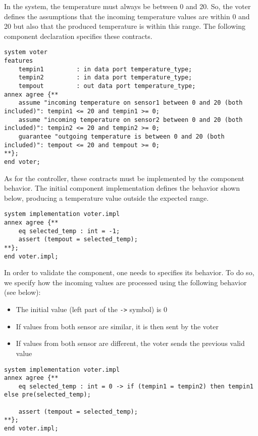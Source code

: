 \documentclass[times, 10pt]{article}
\begin{document}
    In the system, the temperature must always be between 0 and 20. So, the
    voter defines the assumptions that the incoming temperature values are
    within 0 and 20 but also that the produced temperature is within this range.
    The following component declaration specifies these contracts.

\begin{lstlisting}
system voter
features
	tempin1 		: in data port temperature_type;
	tempin2 		: in data port temperature_type;
	tempout 		: out data port temperature_type;
annex agree {**
    assume "incoming temperature on sensor1 between 0 and 20 (both included)": tempin1 <= 20 and tempin1 >= 0;
    assume "incoming temperature on sensor2 between 0 and 20 (both included)": tempin2 <= 20 and tempin2 >= 0;
    guarantee "outgoing temperature is between 0 and 20 (both included)": tempout <= 20 and tempout >= 0;
**}; 
end voter;
\end{lstlisting}

    As for the controller, these contracts must be implemented
    by the component behavior. The initial component implementation defines the
    behavior shown below, producing a temperature value outside the expected
    range.

\begin{lstlisting}
system implementation voter.impl
annex agree {**
	eq selected_temp : int = -1;
    assert (tempout = selected_temp);
**}; 
end voter.impl;

\end{lstlisting}

    In order to validate the component, one needs to specifies its behavior. To
    do so, we specify how the incoming values are processed using the following
    behavior (see below):
    \begin{itemize}
        \item
            The initial value (left part of the \texttt{->} symbol) is 0
         \item
            If values from both sensor are similar, it is then sent by the voter
         \item
            If values from both sensor are different, the voter sends the
            previous valid value
    \end{itemize}

\begin{lstlisting}
system implementation voter.impl
annex agree {**
	eq selected_temp : int = 0 -> if (tempin1 = tempin2) then tempin1 else pre(selected_temp);
	
    assert (tempout = selected_temp);
**}; 
end voter.impl;
\end{lstlisting}
\end{document}
